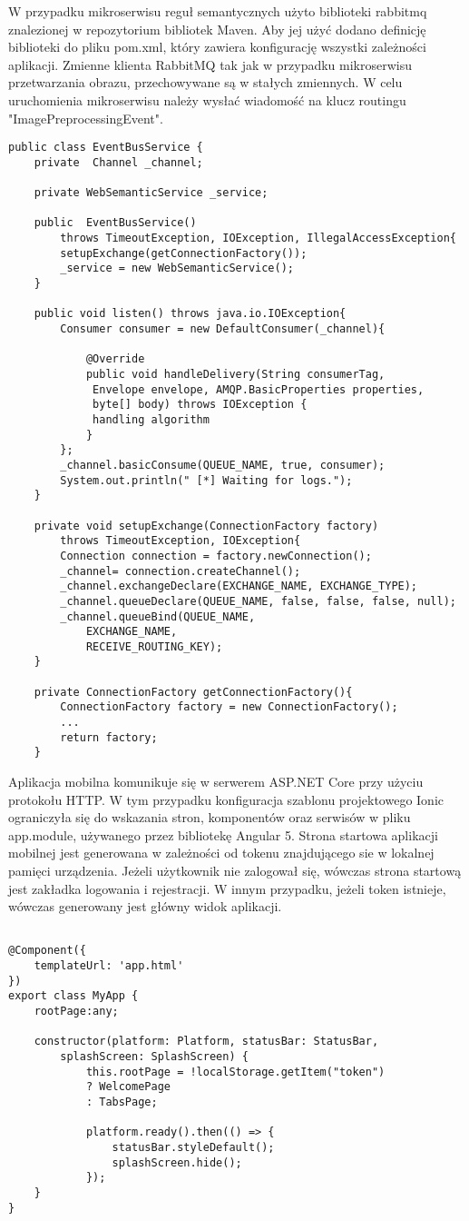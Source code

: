W przypadku mikroserwisu reguł semantycznych użyto biblioteki rabbitmq znalezionej w repozytorium bibliotek Maven. Aby jej użyć dodano definicję biblioteki do pliku pom.xml, który zawiera konfigurację wszystki zależności aplikacji. Zmienne klienta RabbitMQ tak jak w przypadku mikroserwisu przetwarzania obrazu, przechowywane są w stałych zmiennych. W celu uruchomienia mikroserwisu należy wysłać wiadomość na klucz routingu "ImagePreprocessingEvent".
\begin{lstlisting}[caption={Klient RabbitMQ dla mikroserwisu reguł semantycznych.}]
public class EventBusService {
	private  Channel _channel;
	
	private WebSemanticService _service;
	
	public  EventBusService() 
		throws TimeoutException, IOException, IllegalAccessException{
		setupExchange(getConnectionFactory());
		_service = new WebSemanticService();
	}
	
	public void listen() throws java.io.IOException{
		Consumer consumer = new DefaultConsumer(_channel){
			
			@Override
			public void handleDelivery(String consumerTag,
			 Envelope envelope, AMQP.BasicProperties properties, 
			 byte[] body) throws IOException {
			 handling algorithm
			}
		};
		_channel.basicConsume(QUEUE_NAME, true, consumer);
		System.out.println(" [*] Waiting for logs.");
	}
	
	private void setupExchange(ConnectionFactory factory) 
		throws TimeoutException, IOException{
		Connection connection = factory.newConnection();
		_channel= connection.createChannel();
		_channel.exchangeDeclare(EXCHANGE_NAME, EXCHANGE_TYPE);
		_channel.queueDeclare(QUEUE_NAME, false, false, false, null);
		_channel.queueBind(QUEUE_NAME, 
			EXCHANGE_NAME, 
			RECEIVE_ROUTING_KEY);
	}
	
	private ConnectionFactory getConnectionFactory(){
		ConnectionFactory factory = new ConnectionFactory();
		...
		return factory;
	}
\end{lstlisting}
Aplikacja mobilna komunikuje się w serwerem ASP.NET Core przy użyciu protokołu HTTP. W tym przypadku konfiguracja szablonu projektowego Ionic ograniczyła się do wskazania stron, komponentów oraz serwisów w pliku app.module, używanego przez bibliotekę Angular 5. Strona startowa aplikacji mobilnej jest generowana w zależności od tokenu znajdującego sie w lokalnej pamięci urządzenia. Jeżeli użytkownik nie zalogował się, wówczas strona startową jest zakładka logowania i rejestracji. W innym przypadku, jeżeli token istnieje, wówczas generowany jest główny widok aplikacji.
\begin{lstlisting}[caption={Generowanie strony w zależności od tokenu znajdującego sie w pamięci urządzenia.}]

@Component({
	templateUrl: 'app.html'
})
export class MyApp {
	rootPage:any;
	
	constructor(platform: Platform, statusBar: StatusBar, 
		splashScreen: SplashScreen) {
			this.rootPage = !localStorage.getItem("token")
			? WelcomePage
			: TabsPage;
			
			platform.ready().then(() => {
				statusBar.styleDefault();
				splashScreen.hide();
			});
	}
}
\end{lstlisting}


